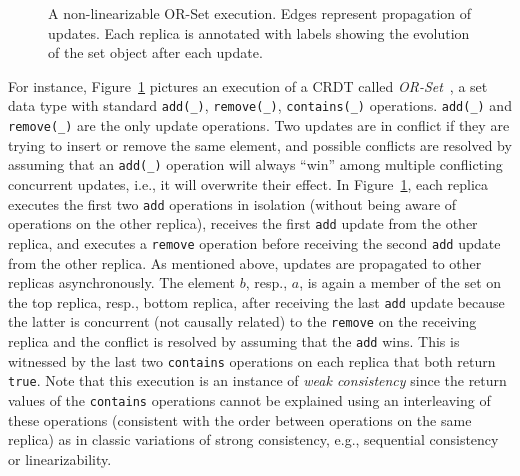 \begin{figure}
\caption{A non-linearizable OR-Set execution. Edges represent propagation of updates. Each replica is annotated with labels showing the evolution of the set object after each update.}
\label{fig:crdt:intro}
\end{figure}

For instance, Figure~\ref{fig:crdt:intro} pictures an execution of a CRDT called \emph{OR-Set}~\cite{DBLP:conf/sss/ShapiroPBZ11}, a set data type with standard \texttt{add(\_)}, \texttt{remove(\_)}, \texttt{contains(\_)} operations. \texttt{add(\_)} and \texttt{remove(\_)} are the only update operations. Two updates are in conflict if they are trying to insert or remove the same element, and possible conflicts are resolved by assuming that an \texttt{add(\_)} operation will always ``win'' among multiple conflicting concurrent updates, i.e., it will overwrite their effect. In Figure~\ref{fig:crdt:intro}, each replica executes the first two \texttt{add} operations in isolation (without being aware of operations on the other replica), receives the first \texttt{add} update from the other replica, and executes a \texttt{remove} operation before receiving the second \texttt{add} update from the other replica. As mentioned above, updates are propagated to other replicas asynchronously. The element $b$, resp., $a$, is again a member of the set on the top replica, resp., bottom replica, after receiving the last \texttt{add} update because the latter is concurrent (not causally related) to the \texttt{remove} on the receiving replica and the conflict is resolved by assuming that the \texttt{add} wins. This is witnessed by the last two \texttt{contains} operations on each replica that both return \texttt{true}. Note that this execution is an instance of \emph{weak consistency} since the return values of the \texttt{contains} operations cannot be explained using an interleaving of these operations (consistent with the order between operations on the same replica) as in classic variations of strong consistency, e.g., sequential consistency~\cite{DBLP:journals/tc/Lamport79} or linearizability\cite{DBLP:journals/toplas/HerlihyW90}.

